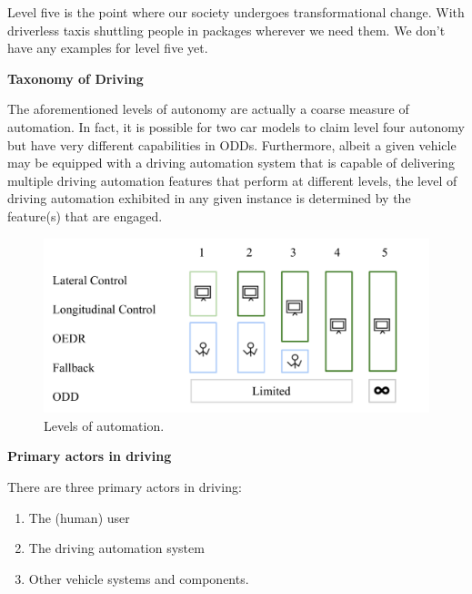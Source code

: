 Level five is the point where our society undergoes transformational change. With driverless taxis shuttling people in packages wherever we need them. 
We don't have any examples for level five yet. 


\begin{framed}
\theoremstyle{remark}
\begin{remark}{\textbf{Taxonomy of Driving}}

The aforementioned levels of autonomy are actually a coarse measure of automation. 
In fact, it is possible for two car models to claim level four autonomy but have very different capabilities in ODDs. 
Furthermore, albeit a given vehicle may be equipped with a driving automation system that is capable of delivering multiple driving automation 
features that perform at different levels, the level of driving automation exhibited in any given instance is determined by the feature(s) that are engaged.
\end{remark}
\end{framed}


\begin{figure}[!htb]
\begin{center}
\includegraphics[scale=0.280]{img/intro_self_driving/levels_of_automation.jpeg}
\end{center}
\caption{Levels of automation.}
\label{levels_of_automation}
\end{figure}

\begin{framed}
\theoremstyle{remark}
\begin{remark}{\textbf{Primary actors in driving}}

There are three primary actors in driving: 

\begin{enumerate}
\item The (human) user
\item The driving automation system
\item Other vehicle systems and components.
\end{enumerate}
\end{remark}
\end{framed}


